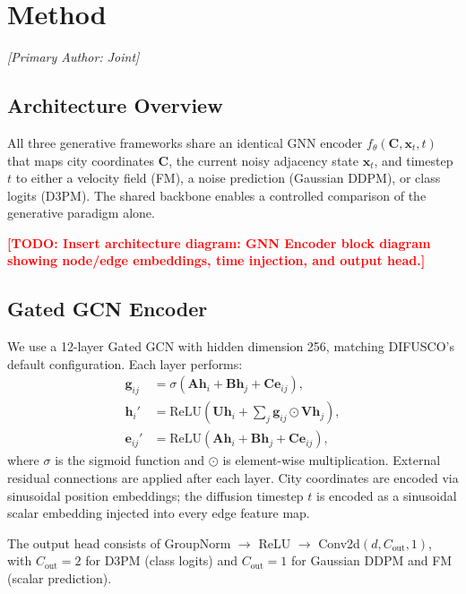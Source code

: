 \documentclass[11pt,a4paper]{article}
\newcommand{\TODO}[1]{\textcolor{red}{\textbf{[TODO: #1]}}}
\begin{document}
\section{Method}
\label{sec:method}
\textit{[Primary Author: Joint]}

\subsection{Architecture Overview}
All three generative frameworks share an identical GNN encoder
$f_\theta(\mathbf{C}, \mathbf{x}_t, t)$ that maps city coordinates $\mathbf{C}$, the
current noisy adjacency state $\mathbf{x}_t$, and timestep $t$ to either a velocity field
(FM), a noise prediction (Gaussian DDPM), or class logits (D3PM). The shared backbone
enables a controlled comparison of the generative paradigm alone.

\TODO{Insert architecture diagram: GNN Encoder block diagram showing node/edge embeddings,
time injection, and output head.}

\subsection{Gated GCN Encoder}
\label{sec:gnn}
We use a 12-layer Gated GCN \citep{bresson2017gatedgcn} with hidden dimension 256,
matching DIFUSCO's default configuration. Each layer performs:
\begin{align}
  \mathbf{g}_{ij} &= \sigma\!\left(
    \mathbf{A}\mathbf{h}_i + \mathbf{B}\mathbf{h}_j + \mathbf{C}\mathbf{e}_{ij}
  \right), \label{eq:gate} \\
  \mathbf{h}_i' &= \text{ReLU}\!\left(\mathbf{U}\mathbf{h}_i
    + \textstyle\sum_j \mathbf{g}_{ij} \odot \mathbf{V}\mathbf{h}_j\right), \\
  \mathbf{e}_{ij}' &= \text{ReLU}\!\left(\mathbf{A}\mathbf{h}_i + \mathbf{B}\mathbf{h}_j
    + \mathbf{C}\mathbf{e}_{ij}\right),
\end{align}
where $\sigma$ is the sigmoid function and $\odot$ is element-wise multiplication.
External residual connections are applied after each layer. City coordinates are encoded
via sinusoidal position embeddings; the diffusion timestep $t$ is encoded as a sinusoidal
scalar embedding injected into every edge feature map.

The output head consists of GroupNorm $\to$ ReLU $\to$ Conv2d$(d, C_\text{out}, 1)$,
with $C_\text{out}=2$ for D3PM (class logits) and $C_\text{out}=1$ for Gaussian DDPM and FM
(scalar prediction).
\end{document}
